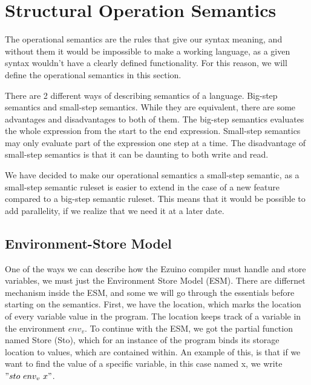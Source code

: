 \section{Structural Operation Semantics}
The operational semantics are the rules that give our syntax meaning, and without them it would be impossible to make a working language, as a given syntax wouldn't have a clearly defined functionality. For this reason, we will define the operational semantics in this section.

There are 2 different ways of describing semantics of a language. Big-step semantics and small-step semantics. While they are equivalent, there are some advantages and disadvantages to both of them. The big-step semantics evaluates the whole expression from the start to the end expression. Small-step semantics may only evaluate part of the expression one step at a time. The disadvantage of small-step semantics is that it can be daunting to both write and read.

We have decided to make our operational semantics a small-step semantic, as a small-step semantic ruleset is easier to extend in the case of a new feature compared to a big-step semantic ruleset. This means that it would be possible to add parallelity, if we realize that we need it at a later date.

\subsection{Environment-Store Model}
One of the ways we can describe how the Ezuino compiler must handle and store variables, we must just the Environment Store Model (ESM). There are differnet mechanism inside the ESM, and some we will go through the essentials before starting on the semantics. First, we have the location, which marks the location of every variable value in the program. The location keeps track of a variable in the environment $env_v$.
To continue with the ESM, we got the partial function named Store (Sto), which for an instance of the program binds its storage location to values, which are contained within. An example of this, is that if we want to find the value of a specific variable, in this case named x, we write $"sto \  env_v \ x"$.


